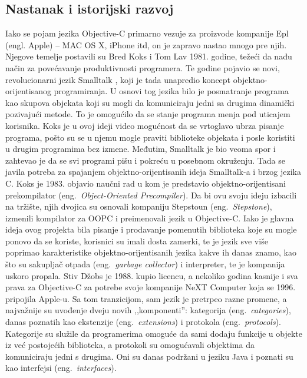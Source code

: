 \documentclass[a4paper]{article}
\begin{document}
{\subsection{Nastanak i istorijski razvoj}
\label{subsec:istorija}
Iako se pojam jezika Objective-C primarno vezuje za proizvode kompanije Epl (engl. Apple) -- MAC OS X, iPhone itd, on je zapravo nastao mnogo pre njih. Njegove temelje postavili su Bred Koks i Tom Lav 1981. godine, težeći da nađu način za povećavanje produktivnosti programera. Te godine pojavio se novi, revolucionarni jezik Smalltalk \cite{smalltalk}, koji je tada unapredio koncept objektno-orijentisanog programiranja. U osnovi tog jezika bilo je posmatranje programa kao skupova objekata koji su mogli da komuniciraju jedni sa drugima dinamički pozivajući metode. To je omogućilo da se stanje programa menja pod uticajem korisnika. Koks je u ovoj ideji video mogućnost da se vrtoglavo ubrza pisanje programa, pošto su se u njemu mogle praviti biblioteke objekata i posle koristiti u drugim programima bez izmene. Međutim, Smalltalk je bio veoma spor i zahtevao je da se svi programi pišu i pokreću u posebnom okruženju. Tada se javila potreba za spajanjem objektno-orijentisanih ideja Smalltalk-a i brzog jezika C. Koks je 1983. objavio naučni rad u kom je predstavio objektno-orijentisani prekompilator (eng.~{\em Object-Oriented Precompiler}). Da bi ovu svoju ideju izbacili na tržište, njih dvojica su osnovali kompaniju Stepstoun (eng.~{\em Stepstone}), izmenili kompilator za OOPC i preimenovali jezik u Objective-C. Iako je glavna ideja ovog projekta bila pisanje i prodavanje pomenutih biblioteka koje su mogle ponovo da se koriste, korisnici su imali dosta zamerki, te je jezik sve više poprimao karakteristike objektno-orijentisanih jezika kakve ih danas znamo, kao što su sakupljač otpada (eng.~{\em garbage collector}) i interpreter, te je kompanija uskoro propala. Stiv Džobs je 1988. kupio licencu, a nekoliko godina kasnije i sva prava za Objective-C za potrebe svoje kompanije NeXT Computer koja se  1996. pripojila Apple-u. Sa tom tranzicijom, sam jezik je pretrpeo razne promene, a najvažnije su uvođenje dveju novih ,,komponenti'': kategorija (eng.~{\em categories}), danas poznatih kao ekstenzije (eng.~{\em extensions}) i protokola (eng.~{\em protocols}). Kategorije su služile da programerima omoguće da sami dodaju funkcije u objekte iz već postojećih biblioteka, a protokoli su omogućavali objektima da komuniciraju jedni s drugima. Oni su danas podržani u jeziku Java i poznati su kao interfejsi (eng.~{\em interfaces}). 

}
\end{document}
